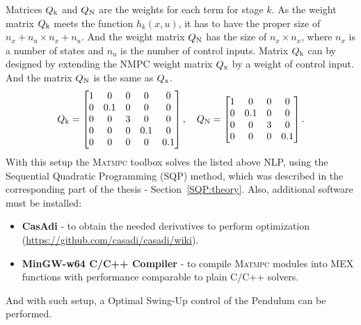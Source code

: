Matrices $Q _{\text{k}}$ and $Q _{\text{N}}$ are the weights for each term for stage $k$. As the weight matrix $Q _{\text{k}}$ meets the function $h_k(x, u)$, it has to have the proper size of $n_x+n_u\times n_x+n_u$. And the weight matrix $Q _{\text{N}}$ has the size of $n_x\times n_x$, where $n_x$ is a number of states and $n_u$ is the number of control inputs. Matrix $Q _{\text{k}}$ can by designed by extending the NMPC weight matrix $Q _{\text{x}}$ by a weight of control input. And the matrix $Q _{\text{N}}$ is the same as $Q _{\text{x}}$.
\begin{equation}\label{NLP:weights}
Q _{\text{k}} = \begin{bmatrix}
				1&0&0&0&0\\
				0&0.1&0&0&0\\
				0&0&3&0&0\\
				0&0&0&0.1&0\\
				0&0&0&0&0.1
			\end{bmatrix}, \quad 
Q _{\text{N}} = \begin{bmatrix}
				1&0&0&0\\
				0&0.1&0&0\\
				0&0&3&0\\
				0&0&0&0.1
			\end{bmatrix}.
\end{equation}
With this setup the \textsc{Matmpc} toolbox solves the listed above NLP, using the Sequential Quadratic Programming (SQP) method, which was described in the corresponding part of the thesis - Section~\ref{SQP:theory}. Also, additional software must be installed:
\begin{itemize}
	\item \textbf{CasAdi} - to obtain the needed derivatives to perform optimization (\url{https://github.com/casadi/casadi/wiki}).
	\item \textbf{MinGW-w64 C/C++ Compiler} - to compile \textsc{Matmpc} modules into MEX functions with performance comparable to plain C/C++ solvers.
\end{itemize}
And with such setup, a Optimal Swing-Up control of the Pendulum can be performed.
\newpage
